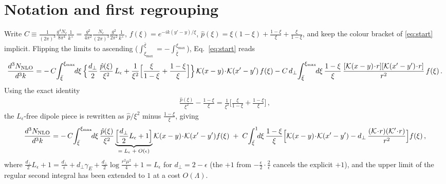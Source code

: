 \documentclass[10pt]{article}
\newcommand{\Leps}{L_{\epsilon}}
\newcommand{\KK}{\mathcal K(x-y)\!\cdot\!\mathcal K(x'-y')}
\begin{document}
\section{Notation and first regrouping}
Write $C\equiv\frac{1}{(2\pi)^{3}}\frac{g^{4}N_{c}}{8\pi^{4}}\frac{1}{k^{+}}
=\frac{g^{2}}{4\pi^{2}}\frac{N_{c}}{(2\pi)^{3}}\frac{g^{2}}{2\pi^{2}}\frac{1}{k^{+}}$,
$f(\xi)=e^{-ik(y'-y)/\xi}$, $\hat p(\xi)=\xi(1-\xi)+\frac{1-\xi}{\xi}+\frac{\xi}{1-\xi}$,
and keep the colour bracket of \eqref{eq:start} implicit. Flipping the limits to ascending
($\int_{\xi_{\max}}^{\bar\xi}=-\int_{\bar\xi}^{\xi_{\max}}$), Eq.~\eqref{eq:start} reads
\begin{align}\label{eq:ascending}
\frac{d^{3}N_{\rm NLO}}{d^{3}k}
=-\,C\!\int_{\bar\xi}^{\xi_{\max}}\!\!d\xi\,\Big\{\frac{d_{\perp}}{2}\,\frac{\hat p(\xi)}{\xi^{2}}\,\Leps
+\frac{1}{\xi^{2}}\Big[\frac{\xi}{1-\xi}+\frac{1-\xi}{\xi}\Big]\Big\}\,\KK\,f(\xi)
-C\,d_{\perp}\!\int_{\bar\xi}^{\xi_{\max}}\!\!d\xi\,\frac{1-\xi}{\xi}\,
\frac{[\mathcal K(x-y)\!\cdot\! r][\mathcal K(x'-y')\!\cdot\! r]}{r^{2}}\,f(\xi)\,.
\end{align}
Using the exact identity
\begin{align}\label{eq:phatid}
\frac{\hat p(\xi)}{\xi^{2}}-\frac{1-\xi}{\xi}
=\frac{1}{\xi^{2}}\Big[\frac{\xi}{1-\xi}+\frac{1-\xi}{\xi}\Big]\,,
\end{align}
the $\Leps$-free dipole piece is rewritten as $\hat p/\xi^{2}$ minus $\frac{1-\xi}{\xi}$, giving
\begin{align}\label{eq:regrouped}
\frac{d^{3}N_{\rm NLO}}{d^{3}k}
=-\,C\!\int_{\bar\xi}^{\xi_{\max}}\!\!d\xi\,\frac{\hat p(\xi)}{\xi^{2}}
\underbrace{\Big[\frac{d_{\perp}}{2}\Leps+1\Big]}_{=\;\Leps\;+\;O(\epsilon)}\KK f(\xi)
\;+\;C\!\int_{\bar\xi}^{1}\!\!d\xi\,\frac{1-\xi}{\xi}
\Big[\KK-d_{\perp}\,\frac{(\mathcal K\!\cdot\! r)(\mathcal K'\!\cdot\! r)}{r^{2}}\Big]f(\xi)\,,
\end{align}
where $\frac{d_{\perp}}{2}\Leps+1=\frac{d_{\perp}}{\epsilon}+d_{\perp}\gamma_{E}
+\frac{d_{\perp}}{2}\log\frac{r^{2}\mu^{2}}{4}+1=\Leps$ for $d_{\perp}=2-\epsilon$
(the $+1$ from $-\frac{\epsilon}{2}\cdot\frac{2}{\epsilon}$ cancels the explicit $+1$), and the
upper limit of the regular second integral has been extended to $1$ at a cost $O(\Lambda)$.
\end{document}
